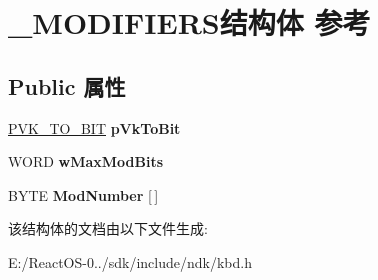 \hypertarget{struct___m_o_d_i_f_i_e_r_s}{}\section{\+\_\+\+M\+O\+D\+I\+F\+I\+E\+R\+S结构体 参考}
\label{struct___m_o_d_i_f_i_e_r_s}
\subsection*{Public 属性}
\begin{DoxyCompactItemize}
\item 
\mbox{\label{struct___m_o_d_i_f_i_e_r_s_a9e2702fdc7926bfc20ea077248584578}} 
\hyperlink{struct___v_k___t_o___b_i_t}{P\+V\+K\+\_\+\+T\+O\+\_\+\+B\+IT} {\bfseries p\+Vk\+To\+Bit}
\item 
\mbox{\label{struct___m_o_d_i_f_i_e_r_s_a2dd93b153f1c8d5e353f5028030cb45a}} 
W\+O\+RD {\bfseries w\+Max\+Mod\+Bits}
\item 
\mbox{\label{struct___m_o_d_i_f_i_e_r_s_a65367e48ba1ceb70f6ea82782859c42a}} 
B\+Y\+TE {\bfseries Mod\+Number} \mbox{[}$\,$\mbox{]}
\end{DoxyCompactItemize}


该结构体的文档由以下文件生成\+:\begin{DoxyCompactItemize}
\item 
E\+:/\+React\+O\+S-\/0../sdk/include/ndk/kbd.\+h\end{DoxyCompactItemize}
